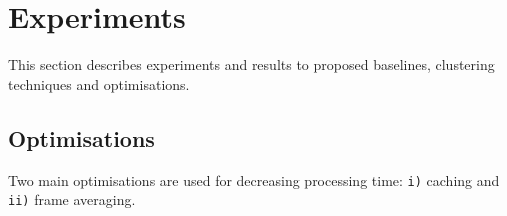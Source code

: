 \documentclass{ExcelAtFIT}
\begin{document}
\begin{table}[hbt]
\centering
\caption{Performance of baseline fuzzy string matching system.}
\label{tab:FuzzyBaseResults}
\end{table}

\section{Experiments}
This section describes experiments and results to proposed baselines, clustering techniques and optimisations.
\subsection{Optimisations}
\label{optimisations}
Two main optimisations are used for decreasing processing time: \texttt{i)} caching and \texttt{ii)} frame averaging.
\end{document}
